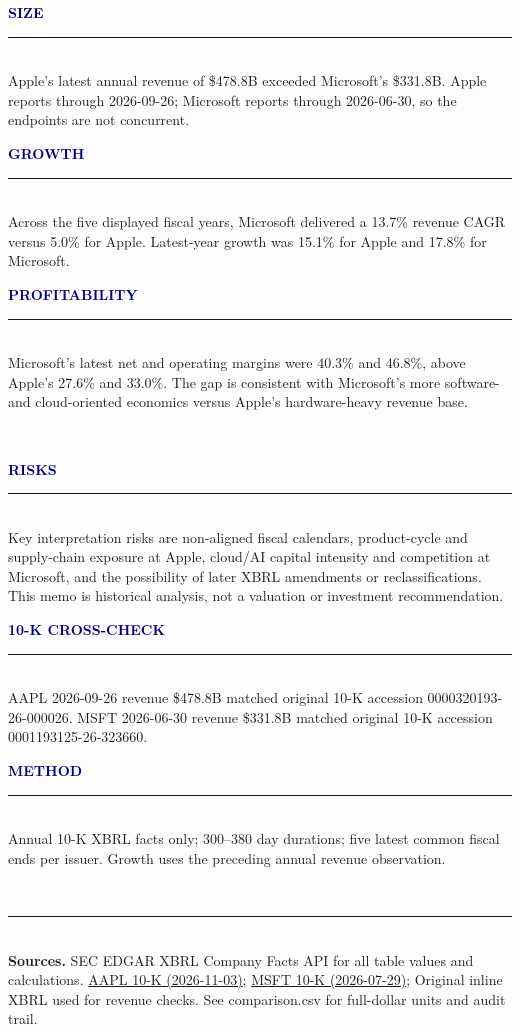 \documentclass[9pt]{article}
\newcommand{\sectionbox}[2]{\textcolor{navy}{\bfseries\MakeUppercase{#1}}\\[-1pt]
  {\color{blue}\rule{\linewidth}{0.8pt}}\\[-2pt]{\footnotesize #2}}
\begin{document}
\begin{minipage}[t]{0.32\linewidth}\sectionbox{Size}{Apple's latest annual revenue of \$478.8B exceeded Microsoft's \$331.8B. Apple reports through 2026-09-26; Microsoft reports through 2026-06-30, so the endpoints are not concurrent.}\end{minipage}\hfill
\begin{minipage}[t]{0.32\linewidth}\sectionbox{Growth}{Across the five displayed fiscal years, Microsoft delivered a 13.7\% revenue CAGR versus 5.0\% for Apple. Latest-year growth was 15.1\% for Apple and 17.8\% for Microsoft.}\end{minipage}\hfill
\begin{minipage}[t]{0.32\linewidth}\sectionbox{Profitability}{Microsoft's latest net and operating margins were 40.3\% and 46.8\%, above Apple's 27.6\% and 33.0\%. The gap is consistent with Microsoft's more software- and cloud-oriented economics versus Apple's hardware-heavy revenue base.}\end{minipage}\\[6pt]
\begin{minipage}[t]{0.32\linewidth}\sectionbox{Risks}{Key interpretation risks are non-aligned fiscal calendars, product-cycle and supply-chain exposure at Apple, cloud/AI capital intensity and competition at Microsoft, and the possibility of later XBRL amendments or reclassifications. This memo is historical analysis, not a valuation or investment recommendation.}\end{minipage}\hfill
\begin{minipage}[t]{0.32\linewidth}\sectionbox{10-K Cross-check}{AAPL 2026-09-26 revenue \$478.8B matched original 10-K accession 0000320193-26-000026. MSFT 2026-06-30 revenue \$331.8B matched original 10-K accession 0001193125-26-323660.}\end{minipage}\hfill
\begin{minipage}[t]{0.32\linewidth}\sectionbox{Method}{Annual 10-K XBRL facts only; 300--380 day durations; five latest common fiscal ends per issuer. Growth uses the preceding annual revenue observation.}\end{minipage}\\[6pt]
{\color{navy}\rule{\linewidth}{0.5pt}}\\[2pt]
{\tiny\textbf{Sources.} SEC EDGAR XBRL Company Facts API for all table values and calculations. \href{https://www.sec.gov/Archives/edgar/data/320193/000032019326000026/aapl-20260926.htm}{AAPL 10-K (2026-11-03)}; \href{https://www.sec.gov/Archives/edgar/data/789019/000119312526323660/msft-20260630.htm}{MSFT 10-K (2026-07-29)};
Original inline XBRL used for revenue checks. See comparison.csv for full-dollar units and audit trail.}
\end{document}

